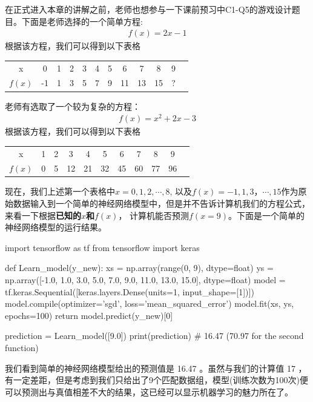 \documentclass[12pt]{article}
\numberwithin{figure}{section}
\newenvironment{fullmodel}{
			\smallskip\noindent
			\begin{minipage}{\textwidth+\marginparwidth+\marginparsep}\smallskip\smallskip}
			{\smallskip\smallskip\end{minipage}\vspace{.1in}
			}
\numberwithin{equation}{section}
\begin{document}
\begin{tcolorbox}[colback=white]
在正式进入本章的讲解之前，老师也想参与一下课前预习中C1-Q5的游戏设计题目。下面是老师选择的一个简单方程:
\begin{align*}
	f(x) = 2x - 1 
\end{align*}
根据该方程，我们可以得到以下表格
\begin{table}[H]
	\centering
	\begin{tabular}{cccccccccccc}
		\hline 
		x & 0 & 1 & 2 & 3 & 4 & 5 & 6 & 7 & 8 & 9 \\
		$f(x)$ & -1 & 1 & 3 &  5 &  7 &  9 & 11 &  13 & 15 & ? \\
		\hline 
	\end{tabular}
\end{table}
老师有选取了一个较为复杂的方程：
\begin{align*}
	f(x) = x^2 + 2x - 3 
\end{align*}
根据该方程，我们可以得到以下表格
\begin{table}[H]
	\centering
	\begin{tabular}{ccccccccccc}
		\hline 
		x & 1 & 2 & 3 & 4 & 5 & 6 & 7 & 8 & 9 \\
		$f(x)$ & 0 & 5 &  12 &  21 &  32 & 45 &  60 & 77 & 96 \\
		\hline 
	\end{tabular}
\end{table}
\end{tcolorbox}

\begin{fullmodel}
现在，我们上述第一个表格中$x = 0, 1, 2, \cdots, 8$, 以及$f(x)=-1, 1, 3， \cdots, 15$作为原始数据输入到一个简单的神经网络模型中，但是并不告诉计算机我们的方程公式，来看一下根据\textbf{已知的$x$和$f(x)$}， 计算机能否预测$f(x=9)$。下面是一个简单的神经网络模型的运行结果。
\begin{python}
import tensorflow as tf
from tensorflow import keras


def Learn_model(y_new):
    xs = np.array(range(0, 9), dtype=float)
    ys = np.array([-1.0, 1.0, 3.0, 5.0, 7.0, 9.0, 11.0, 13.0, 15.0], dtype=float)
    model = tf.keras.Sequential([keras.layers.Dense(units=1, input_shape=[1])])
    model.compile(optimizer='sgd', loss='mean_squared_error')
    model.fit(xs, ys, epochs=100)
    return model.predict(y_new)[0]


prediction = Learn_model([9.0])
print(prediction)  # 16.47 (70.97 for the second function)
\end{python} 	
我们看到简单的神经网络模型给出的预测值是 16.47 。虽然与我们的计算值 17 ，有一定差距，但是考虑到我们只给出了9个匹配数据组，模型(训练次数为100次)便可以预测出与真值相差不大的结果，这已经可以显示机器学习的魅力所在了。
\end{fullmodel}
\end{document}
